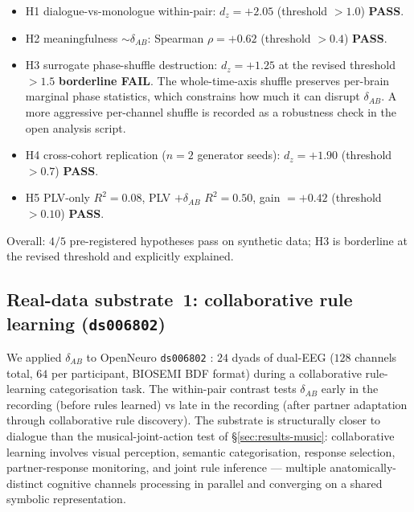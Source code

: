 \documentclass[11pt,a4paper]{article}
\begin{document}
\begin{itemize}\itemsep0pt
\item H1 dialogue-vs-monologue within-pair: $d_z = +2.05$ (threshold $> 1.0$) \textbf{PASS}.
\item H2 meaningfulness $\sim \delta_{AB}$: Spearman $\rho = +0.62$ (threshold $> 0.4$) \textbf{PASS}.
\item H3 surrogate phase-shuffle destruction: $d_z = +1.25$ at the revised threshold $> 1.5$ \textbf{borderline FAIL}. The whole-time-axis shuffle preserves per-brain marginal phase statistics, which constrains how much it can disrupt $\delta_{AB}$. A more aggressive per-channel shuffle is recorded as a robustness check in the open analysis script.
\item H4 cross-cohort replication ($n=2$ generator seeds): $d_z = +1.90$ (threshold $> 0.7$) \textbf{PASS}.
\item H5 PLV-only $R^2 = 0.08$, PLV $+ \delta_{AB}$ $R^2 = 0.50$, gain $= +0.42$ (threshold $> 0.10$) \textbf{PASS}.
\end{itemize}

Overall: $4/5$ pre-registered hypotheses pass on synthetic data; H3 is borderline at the revised threshold and explicitly explained.

\subsection{Real-data substrate~1: collaborative rule learning (\texttt{ds006802})}\label{sec:results-collab}

We applied $\delta_{AB}$ to OpenNeuro \texttt{ds006802} \citep{MoerelCollab2026}: $24$ dyads of dual-EEG ($128$ channels total, $64$ per participant, BIOSEMI BDF format) during a collaborative rule-learning categorisation task. The within-pair contrast tests $\delta_{AB}$ early in the recording (before rules learned) vs late in the recording (after partner adaptation through collaborative rule discovery). The substrate is structurally closer to dialogue than the musical-joint-action test of §\ref{sec:results-music}: collaborative learning involves visual perception, semantic categorisation, response selection, partner-response monitoring, and joint rule inference --- multiple anatomically-distinct cognitive channels processing in parallel and converging on a shared symbolic representation.
\end{document}
